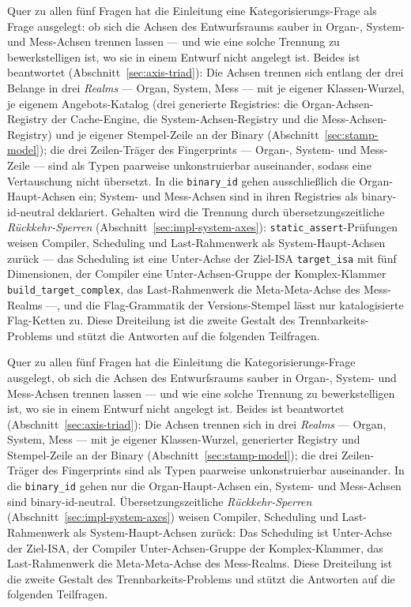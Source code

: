 \begin{nurlang}
Quer zu allen fünf Fragen hat die Einleitung eine Kategorisierungs-Frage als Frage ausgelegt: ob sich die Achsen
des Entwurfsraums sauber in Organ-, System- und Mess-Achsen trennen lassen --- und wie eine solche
Trennung zu bewerkstelligen ist, wo sie in einem Entwurf nicht angelegt ist. Beides ist beantwortet
(Abschnitt~\ref{sec:axis-triad}): Die Achsen trennen sich entlang der drei Belange in drei \emph{Realms}
--- Organ, System, Mess --- mit je eigener Klassen-Wurzel, je eigenem Angebots-Katalog (drei generierte
Registries: die Organ-Achsen-Registry der Cache-Engine, die System-Achsen-Registry und die
Mess-Achsen-Registry) und je eigener Stempel-Zeile an der Binary (Abschnitt~\ref{sec:stamp-model}); die
drei Zeilen-Träger des Fingerprints --- Organ-, System- und Mess-Zeile --- sind als Typen paarweise
unkonstruierbar auseinander, sodass eine Vertauschung nicht übersetzt. In die \texttt{binary\_id} gehen
ausschließlich die Organ-Haupt-Achsen ein; System- und Mess-Achsen sind in ihren Registries als
binary-id-neutral deklariert. Gehalten wird die Trennung durch übersetzungszeitliche
\emph{Rückkehr-Sperren} (Abschnitt~\ref{sec:impl-system-axes}): \texttt{static\_assert}-Prüfungen weisen
Compiler, Scheduling und Last-Rahmenwerk als System-Haupt-Achsen zurück --- das Scheduling ist eine
Unter-Achse der Ziel-ISA \texttt{target\_isa} mit fünf Dimensionen, der Compiler eine Unter-Achsen-Gruppe
der Komplex-Klammer \texttt{build\_target\_complex}, das Last-Rahmenwerk die Meta-Meta-Achse des
Mess-Realms ---, und die Flag-Grammatik der Versions-Stempel lässt nur katalogisierte Flag-Ketten zu.
Diese Dreiteilung ist die zweite Gestalt des Trennbarkeits-Problems und stützt die Antworten auf die
folgenden Teilfragen.
\end{nurlang}
\begin{nurkurz}
Quer zu allen fünf Fragen hat die Einleitung die Kategorisierungs-Frage ausgelegt, ob sich die Achsen des
Entwurfsraums sauber in Organ-, System- und Mess-Achsen trennen lassen --- und wie eine solche Trennung zu
bewerkstelligen ist, wo sie in einem Entwurf nicht angelegt ist. Beides ist beantwortet
(Abschnitt~\ref{sec:axis-triad}): Die Achsen trennen sich in drei \emph{Realms} --- Organ, System, Mess ---
mit je eigener Klassen-Wurzel, generierter Registry und Stempel-Zeile an der Binary
(Abschnitt~\ref{sec:stamp-model}); die drei Zeilen-Träger des Fingerprints sind als Typen paarweise
unkonstruierbar auseinander. In die \texttt{binary\_id} gehen nur die Organ-Haupt-Achsen ein, System- und
Mess-Achsen sind binary-id-neutral. Übersetzungszeitliche \emph{Rückkehr-Sperren}
(Abschnitt~\ref{sec:impl-system-axes}) weisen Compiler, Scheduling und Last-Rahmenwerk als
System-Haupt-Achsen
zurück: Das Scheduling ist Unter-Achse der Ziel-ISA, der Compiler Unter-Achsen-Gruppe der Komplex-Klammer,
das Last-Rahmenwerk die Meta-Meta-Achse des Mess-Realms. Diese Dreiteilung ist die zweite Gestalt des
Trennbarkeits-Problems und stützt die Antworten auf die folgenden Teilfragen.
\end{nurkurz}

